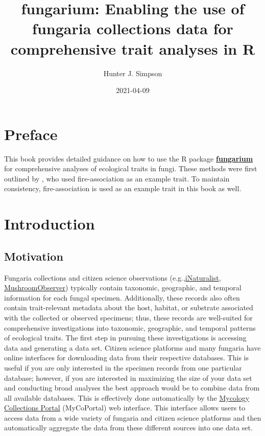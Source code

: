 \documentclass[
]{book}
\title{fungarium: Enabling the use of fungaria collections data for comprehensive trait analyses in R}
\author{Hunter J. Simpson}
\date{2021-04-09}
\begin{document}
\maketitle

{
\setcounter{tocdepth}{1}
\tableofcontents
}
\hypertarget{preface}{%
\chapter*{Preface}\label{preface}}

This book provides detailed guidance on how to use the R package \href{https://www.github.com/hjsimpso/fungarium}{\textbf{fungarium}} for comprehensive analyses of ecological traits in fungi. These methods were first outlined by \citet{fungarium2021}, who used fire-association as an example trait. To maintain consistency, fire-association is used as an example trait in this book as well.

\hypertarget{intro}{%
\chapter{Introduction}\label{intro}}

\hypertarget{motivation}{%
\section{Motivation}\label{motivation}}

Fungaria collections and citizen science observations (e.g.,\href{https://www.inaturalist.org}{iNaturalist}, \href{https://mushroomobserver.org}{MushroomObserver}) typically contain taxonomic, geographic, and temporal information for each fungal specimen. Additionally, these records also often contain trait-relevant metadata about the host, habitat, or substrate associated with the collected or observed specimens; thus, these records are well-suited for comprehensive investigations into taxonomic, geographic, and temporal patterns of ecological traits. The first step in pursuing these investigations is accessing data and generating a data set. Citizen science platforms and many fungaria have online interfaces for downloading data from their respective databases. This is useful if you are only interested in the specimen records from one particular database; however, if you are interested in maximizing the size of your data set and conducting broad analyses the best approach would be to combine data from all available databases. This is effectively done automatically by the \href{https://mycoportal.org}{Mycology Collections Portal} (MyCoPortal) web interface. This interface allows users to access data from a wide variety of fungaria and citizen science platforms and then automatically aggregate the data from these different sources into one data set.
\end{document}
